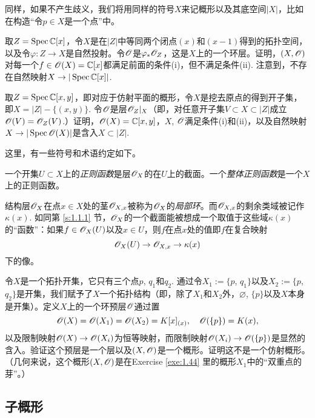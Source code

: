 同样，如果不产生歧义，我们将用同样的符号$X$来记概形以及其底空间$|X|$，比如在构造“令$p\in X$是一个点”中。

\begin{exe}
\begin{compactenum}[(a)]
\item 取$Z=\operatorname{Spec} \mathbb{C}[x]$，令$X$是在$|Z|$中等同两个闭点$(x)$和$(x-1)$得到的拓扑空间，以及令$\varphi:Z\to X$是自然投射。令$\mathscr{O}$是$\varphi_* \mathscr{O}_Z$，这是$X$上的一个环层。证明，$(X,\mathscr{O})$对每一个$f\in\mathscr{O}(X)=\mathbb{C}[x]$都满足前面的条件(i)，但不满足条件(ii). 注意到，不存在自然映射$X\to |\operatorname{Spec}\mathbb{C}[x]|$.
\item 取$Z=\operatorname{Spec} \mathbb{C}[x,y]$，即对应于仿射平面的概形，令$X$是挖去原点的得到开子集，即$X=|Z|-\{(x,y)\}$. 令$\mathscr{O}$是层$\mathscr{O}_Z|_X$（即，对任意开子集$V\subset X\subset |Z|$成立$\mathscr{O}(V)=\mathscr{O}_Z(V)$.）证明，$\mathscr{O}(X)=\mathbb{C}[x,y]$，$X$, $\mathscr{O}$满足条件(i)和(ii)，以及自然映射$X\to |\operatorname{Spec}\mathscr{O}(X)|$是含入$X\subset |Z|$.
\end{compactenum}
\end{exe}

这里，有一些符号和术语约定如下。

一个开集$U\subset X$上的\textit{正则函数}是层$\mathscr{O}_X$的在$U$上的截面。一个\textit{整体正则函数}是一个$X$上的正则函数。

结构层$\mathscr{O}_X$在点$x\in X$处的茎$\mathscr{O}_{X,x}$被称为$\mathscr{O}_X$的\textit{局部环}。而$\mathscr{O}_{X,x}$的剩余类域被记作$\kappa(x)$. 如同第 \ref{s:1.1.1} 节，$\mathscr{O}_X$的一个截面能被想成一个取值于这些域$\kappa(x)$的“函数”：如果$f\in\mathscr{O}_X(U)$以及$x\in U$，则$f$在点$x$处的值即$f$在复合映射
\[
	\mathscr{O}_X(U)\to \mathscr{O}_{X,x}\to \kappa(x)
\]
下的像。

\begin{exe}[最小的非仿射概形]
令$X$是一个拓扑开集，它只有三个点$p$, $q_1$和$q_2$. 通过令$X_1:=\{p$, $q_1\}$以及$X_2:=\{p$, $q_2\}$是开集，我们赋予了$X$一个拓扑结构（即，除了$X_1$和$X_2$外，$\varnothing$, $\{p\}$以及$X$本身是开集）。定义$X$上的一个环预层$\mathscr{O}$通过置
\[
	\mathscr{O}(X)=\mathscr{O}(X_1)=\mathscr{O}(X_2)=K[x]_{(x)},\quad \mathscr{O}(\{p\})=K(x),
\]
以及限制映射$\mathscr{O}(X)\to \mathscr{O}(X_i)$为恒等映射，而限制映射$\mathscr{O}(X_i)\to \mathscr{O}(\{p\})$是显然的含入。验证这个预层是一个层以及$(X,\mathscr{O})$是一个概形。证明这不是一个仿射概形。（几何来说，这个概形$(X,\mathscr{O})$是在Exercise \ref{exe:1.44}  里的概形$X_1$中的“双重点的芽”。）
\end{exe}

\subsection{子概形} \label{s:1.2.1}


